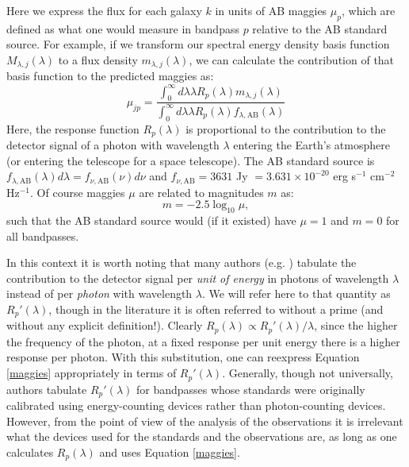 \documentclass[10pt,preprint]{aastex}
\begin{document}
Here we express the flux for each galaxy $k$ in units of AB maggies
$\mu_p$, which are defined as what one would measure in bandpass $p$
relative to the AB standard source. For example, if we transform our
spectral energy density basis function $M_{\lambda, j}(\lambda)$ to a flux
density $m_{\lambda, j}(\lambda)$, we can calculate the contribution of
that basis function to the predicted maggies as:
\begin{equation}
\label{maggies}
\mu_{jp} = 
\frac{\int_0^{\infty} d\lambda \lambda R_p(\lambda) {m}_{\lambda, j}(\lambda)}
{\int_0^\infty d\lambda \lambda R_p(\lambda) f_{\lambda,
\mathrm{AB}}(\lambda) }
\end{equation}
Here, the response function $R_p(\lambda)$ is proportional to the
contribution to the detector signal of a photon with wavelength
$\lambda$ entering the Earth's atmosphere (or entering the telescope
for a space telescope). The AB standard source is $f_{\lambda,
\mathrm{AB}}(\lambda) d\lambda = f_{\nu,
\mathrm{AB}} (\nu) d\nu$ and $f_{\nu, \mathrm{AB}}=3631$ Jy $= 3.631 \times
10^{-20}$ erg s$^{-1}$ cm$^{-2}$ Hz$^{-1}$. Of course maggies $\mu$
are related to magnitudes $m$ as:
\begin{equation}
m = -2.5 \log_{10} \mu, 
\end{equation}
such that the AB standard source would (if it existed) have $\mu=1$
and $m=0$ for all bandpasses.

In this context it is worth noting that many authors
(e.g. \citealt{bessell90a}) tabulate the contribution to the detector
signal per {\it unit of energy} in photons of wavelength $\lambda$
instead of per {\it photon} with wavelength $\lambda$.  We will refer here
to that quantity as $R_p'(\lambda)$, though in the literature it is
often referred to without a prime (and without any explicit
definition!). Clearly $R_p(\lambda) \propto R_p'(\lambda)/\lambda$,
since the higher the frequency of the photon, at a fixed response per
unit energy there is a higher response per photon. With this
substitution, one can reexpress Equation
\ref{maggies} appropriately in terms of $R_p'(\lambda)$.  
Generally, though not universally, authors tabulate $R_p'(\lambda)$
for bandpasses whose standards were originally calibrated using
energy-counting devices rather than photon-counting devices. However,
from the point of view of the analysis of the observations it is
irrelevant what the devices used for the standards and the
observations are, as long as one calculates $R_p(\lambda)$ and uses
Equation \ref{maggies}.  
\end{document}
